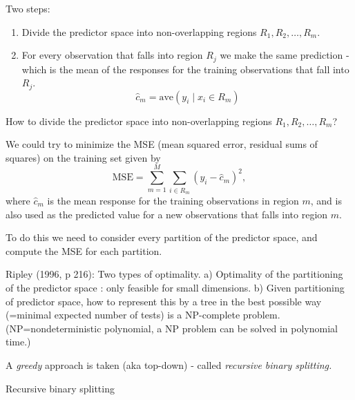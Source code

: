 \documentclass[
  ignorenonframetext,
]{beamer}
\providecommand{\tightlist}{%
  \setlength{\itemsep}{0pt}\setlength{\parskip}{0pt}}
\begin{document}
\begin{frame}

Two steps:

\begin{enumerate}
\tightlist
\item
  Divide the predictor space into non-overlapping regions
  \(R_1,R_2,\ldots,R_m\).
\item
  For every observation that falls into region \(R_j\) we make the same
  prediction - which is the mean of the responses for the training
  observations that fall into \(R_j\).
  \[\hat{c}_m=\text{ave}(y_i \mid x_i \in R_m)\]
\end{enumerate}

How to divide the predictor space into non-overlapping regions
\(R_1,R_2,\ldots,R_m\)?

\end{frame}

\begin{frame}

We could try to minimize the MSE (mean squared error, residual sums of
squares) on the training set given by \[
\text{MSE}=\sum_{m=1}^M \sum_{i \in R_m}(y_i-\hat{c}_m)^2,
\] where \(\hat{c}_m\) is the mean response for the training
observations in region \(m\), and is also used as the predicted value
for a new observations that falls into region \(m\).

To do this we need to consider every partition of the predictor space,
and compute the MSE for each partition.

\end{frame}

\begin{frame}

Ripley (1996, p 216): Two types of optimality. a) Optimality of the
partitioning of the predictor space : only feasible for small
dimensions. b) Given partitioning of predictor space, how to represent
this by a tree in the best possible way (=minimal expected number of
tests) is a NP-complete problem. (NP=nondeterministic polynomial, a NP
problem can be solved in polynomial time.)

A \emph{greedy} approach is taken (aka top-down) - called
\emph{recursive binary splitting.}

\end{frame}

\begin{frame}

\begin{block}{Recursive binary splitting}

\end{block}

\end{frame}
\end{document}
